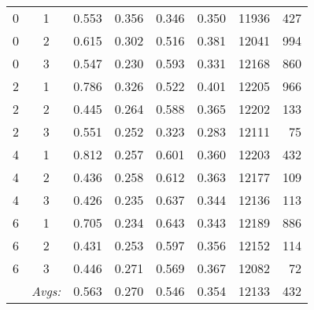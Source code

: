 \begin{enumerate}
{{\begin{table}
{\begin{tabular}{cc|ccccrr}
0 & 1 & 0.553 & 0.356 & 0.346 & 0.350 & 11936 & 427 \\
0 & 2 & 0.615 & 0.302 & 0.516 & 0.381 & 12041 & 994 \\%
0 & 3 & 0.547 & 0.230 & 0.593 & 0.331 & 12168 & 860 \\ \hline %
2 & 1 & 0.786 & 0.326 & 0.522 & 0.401 & 12205 & 966 \\%
2 & 2 & 0.445 & 0.264 & 0.588 & 0.365 & 12202 & 133 \\%
2 & 3 & 0.551 & 0.252 & 0.323 & 0.283 & 12111 & 75 \\ \hline %
4 & 1 & 0.812 & 0.257 & 0.601 & 0.360 & 12203 & 432 \\%
4 & 2 & 0.436 & 0.258 & 0.612 & 0.363 & 12177 & 109 \\%
4 & 3 & 0.426 & 0.235 & 0.637 & 0.344 & 12136 & 113 \\ \hline %
6 & 1 & 0.705 & 0.234 & 0.643 & 0.343 & 12189 & 886 \\%
6 & 2 & 0.431 & 0.253 & 0.597 & 0.356 & 12152 & 114 \\%
6 & 3 & 0.446 & 0.271 & 0.569 & 0.367 & 12082 & 72 \\ \hline \hline%
 & \textit{Avgs:} & 0.563 & 0.270 & 0.546 & 0.354 & 12133 & 432 \\
\end{tabular}
}


\end{table}}}
\end{enumerate}
